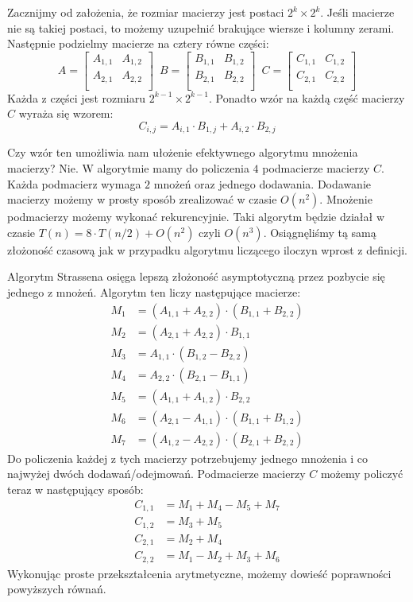 Zacznijmy od założenia, że rozmiar macierzy jest postaci $2^k \times 2^k$.
Jeśli macierze nie są takiej postaci, to możemy uzupełnić brakujące wiersze i kolumny zerami.
Następnie podzielmy macierze na cztery równe części:
\[
  A = 
  \begin{bmatrix}
    A_{1,1} & A_{1,2} \\
    A_{2,1} & A_{2,2} \\
  \end{bmatrix} \enspace  
  B = 
  \begin{bmatrix}
    B_{1,1} & B_{1,2} \\
    B_{2,1} & B_{2,2} \\
  \end{bmatrix} \enspace
  C = 
  \begin{bmatrix}
    C_{1,1} & C_{1,2} \\
    C_{2,1} & C_{2,2} \\
  \end{bmatrix}
\]
Każda z części jest rozmiaru $2^{k-1} \times 2^{k-1}$.
Ponadto wzór na każdą część macierzy $C$ wyraża się wzorem:
\[
 C_{i,j} = A_{i,1} \cdot B_{1,j} + A_{i,2} \cdot B_{2,j}
\]

Czy wzór ten umożliwia nam ułożenie efektywnego algorytmu mnożenia macierzy?
Nie.
W algorytmie mamy do policzenia $4$ podmacierze macierzy $C$.
Każda podmacierz wymaga $2$ mnożeń oraz jednego dodawania.
Dodawanie macierzy możemy w prosty sposób zrealizować w czasie $O(n^2)$.
Mnożenie podmacierzy możemy wykonać rekurencyjnie.
Taki algorytm będzie działał w czasie $T(n) = 8\cdot T(n/2) + O(n^2)$ czyli $O(n^3)$.
Osiągnęliśmy tą samą złożoność czasową jak w przypadku algorytmu liczącego iloczyn wprost z definicji.

Algorytm Strassena osięga lepszą złożoność asymptotyczną przez pozbycie się jednego z mnożeń.
Algorytm ten liczy następujące macierze:
\begin{align*}
 M_1 &= (A_{1,1} + A_{2,2}) \cdot (B_{1,1} + B_{2,2}) \\
 M_2 &= (A_{2,1} + A_{2,2}) \cdot B_{1,1} \\
 M_3 &= A_{1,1} \cdot (B_{1,2} - B_{2,2}) \\
 M_4 &= A_{2,2} \cdot (B_{2,1} - B_{1,1}) \\
 M_5 &= (A_{1,1} + A_{1,2}) \cdot B_{2,2} \\
 M_6 &= (A_{2,1} - A_{1,1}) \cdot (B_{1,1} + B_{1,2}) \\
 M_7 &= (A_{1,2} - A_{2,2}) \cdot (B_{2,1} + B_{2,2})
\end{align*}
Do policzenia każdej z tych macierzy potrzebujemy jednego mnożenia i co najwyżej dwóch dodawań/odejmowań.
Podmacierze macierzy $C$ możemy policzyć teraz w następujący sposób:
\begin{align*}
 C_{1,1} &= M_1 + M_4 - M_5 + M_7 \\
 C_{1,2} &= M_3 + M_5 \\
 C_{2,1} &= M_2 + M_4 \\
 C_{2,2} &= M_1 - M_2 + M_3 + M_6
\end{align*}
Wykonując proste przekształcenia arytmetyczne, możemy dowieść poprawności powyższych równań.

